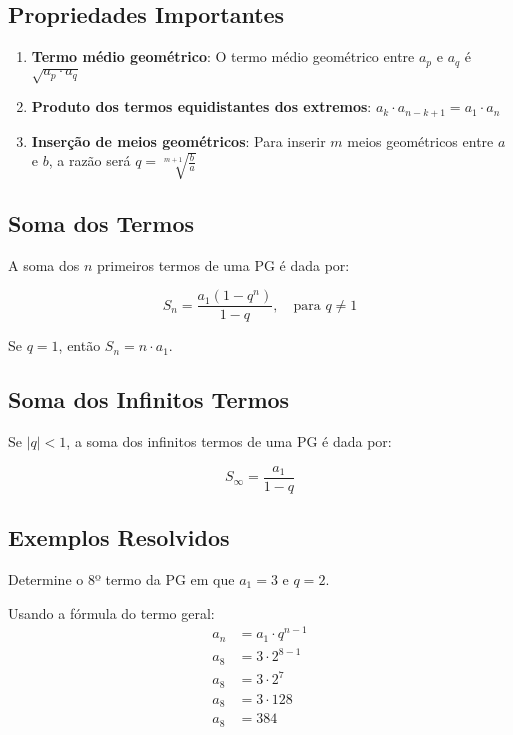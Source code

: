 \documentclass[12pt,a4paper]{article}
\begin{document}
\subsection{Propriedades Importantes}

\begin{enumerate}
    \item \textbf{Termo médio geométrico}: O termo médio geométrico entre $a_p$ e $a_q$ é $\sqrt{a_p \cdot a_q}$
    \item \textbf{Produto dos termos equidistantes dos extremos}: $a_k \cdot a_{n-k+1} = a_1 \cdot a_n$
    \item \textbf{Inserção de meios geométricos}: Para inserir $m$ meios geométricos entre $a$ e $b$, a razão será $q = \sqrt[m+1]{\frac{b}{a}}$
\end{enumerate}

\subsection{Soma dos Termos}

A soma dos $n$ primeiros termos de uma PG é dada por:

\begin{equation}
S_n = \frac{a_1(1-q^n)}{1-q}, \quad \text{para } q \neq 1
\end{equation}

Se $q = 1$, então $S_n = n \cdot a_1$.

\subsection{Soma dos Infinitos Termos}

Se $|q| < 1$, a soma dos infinitos termos de uma PG é dada por:

\begin{equation}
S_{\infty} = \frac{a_1}{1-q}
\end{equation}

\subsection{Exemplos Resolvidos}

\begin{tcolorbox}[colback=blue!5!white,colframe=blue!75!black,title=Exemplo 1]
Determine o 8º termo da PG em que $a_1 = 3$ e $q = 2$.
\end{tcolorbox}

\begin{tcolorbox}[colback=green!5!white,colframe=green!75!black,title=Resolução]
Usando a fórmula do termo geral:
\begin{align}
a_n &= a_1 \cdot q^{n-1}\\
a_8 &= 3 \cdot 2^{8-1}\\
a_8 &= 3 \cdot 2^7\\
a_8 &= 3 \cdot 128\\
a_8 &= 384
\end{align}
\end{tcolorbox}
\end{document}
